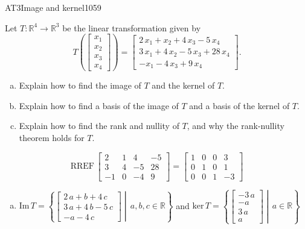 \begin{exercise}{AT3}{Image and kernel}{1059} 
\begin{exerciseStatement} 

 Let \(T:\mathbb{R}^4 \to \mathbb{R}^3\) be the linear transformation given by \[T\left( \left[\begin{array}{c}
x_{1} \\
x_{2} \\
x_{3} \\
x_{4}
\end{array}\right] \right) = \left[\begin{array}{c}
2 \, x_{1} + x_{2} + 4 \, x_{3} - 5 \, x_{4} \\
3 \, x_{1} + 4 \, x_{2} - 5 \, x_{3} + 28 \, x_{4} \\
-x_{1} - 4 \, x_{3} + 9 \, x_{4}
\end{array}\right].\] 

 

\begin{enumerate}[(a)]
\item Explain how to find the image of \(T\) and the kernel of \(T\).
\item Explain how to find a basis of the image of \(T\) and a basis of the kernel of \(T\).
\item Explain how to find the rank and nullity of \(T\), and why the rank-nullity theorem holds for \(T\).
\end{enumerate}

     \end{exerciseStatement}
 \begin{exerciseAnswer} 

\[\mathrm{RREF}\,\left[\begin{array}{cccc}
2 & 1 & 4 & -5 \\
3 & 4 & -5 & 28 \\
-1 & 0 & -4 & 9
\end{array}\right]=\left[\begin{array}{cccc}
1 & 0 & 0 & 3 \\
0 & 1 & 0 & 1 \\
0 & 0 & 1 & -3
\end{array}\right]\]

 

\begin{enumerate}[(a)]
\item  

 \(\mathrm{Im}\,T =  \left\{ \left[\begin{array}{c}
2 \, a + b + 4 \, c \\
3 \, a + 4 \, b - 5 \, c \\
-a - 4 \, c
\end{array}\right] \middle|\,a,b,c\in\mathbb{R}\right\}\) and \(\mathrm{ker}\,T = \left\{ \left[\begin{array}{c}
-3 \, a \\
-a \\
3 \, a \\
a
\end{array}\right] \middle|\,a\in\mathbb{R}\right\}\) 


\end{enumerate}
\end{exerciseAnswer}
\end{exercise}
